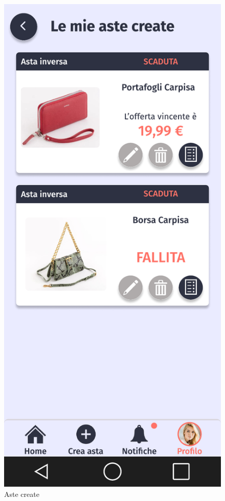 \begin{figure}[!htb]
\begin{minipage}{0.32\textwidth}
                    \includegraphics[width=.7\linewidth]{Immagini/Frames/Compratore/C14.pdf}
                    \caption{Aste create}
            \end{minipage}\hfill
        \end{figure}

        \clearpage
        
